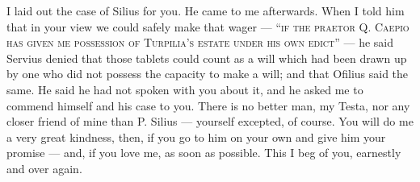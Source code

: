 

 I laid out the case of Silius for you. He came to me afterwards. When I told him that in your view we could safely make that wager --- ``\textsc{if the praetor Q. Caepio has given me possession of Turpilia's estate under his own edict}'' --- he said Servius denied that those tablets could count as a will which had been drawn up by one who did not possess the capacity to make a will; and that Ofilius said the same. He said he had not spoken with you about it, and he asked me to commend himself and his case to you. There is no better man, my Testa, nor any closer friend of mine than P. Silius --- yourself excepted, of course. You will do me a very great kindness, then, if you go to him on your own and give him your promise --- and, if you love me, as soon as possible. This I beg of you, earnestly and over again.
